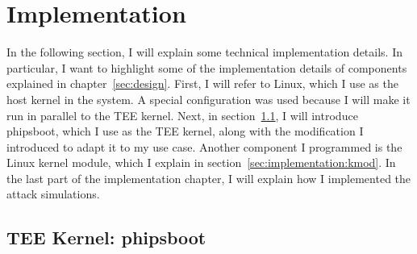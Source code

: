 \chapter{Implementation}
\label{sec:implementation}


In the following section, I will explain some technical implementation details.
In particular, I want to highlight some of the implementation details of
components explained in chapter~\ref{sec:design}. First, I will refer to Linux,
which I use as the host kernel in the system. A special configuration was used
because I will make it run in parallel to the TEE kernel. Next, in
section~\ref{sec:implementation:teeKernel}, I will introduce phipsboot, which I
use as the TEE kernel, along with the modification I introduced to adapt it to
my use case. Another component I programmed is the Linux kernel module, which I
explain in section~\ref{sec:implementation:kmod}. In the last part of the
implementation chapter, I will explain how I implemented the attack simulations.

\section{TEE Kernel: phipsboot}
\label{sec:implementation:teeKernel}

